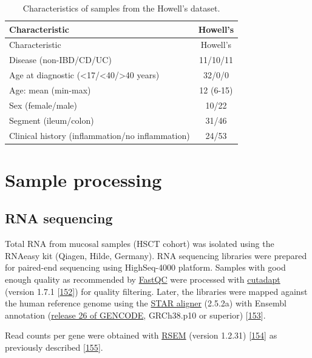\documentclass[
  12pt,
  a4paper,
  twoside,
  openright]{book}
\begin{document}
\begin{longtable}[]{@{}lc@{}}
\caption{\label{tab:howell} Characteristics of samples from the Howell's dataset.}\tabularnewline
\toprule
Characteristic & Howell's \\
\midrule
\endfirsthead
\toprule
Characteristic & Howell's \\
\midrule
\endhead
Disease (non-IBD/CD/UC) & 11/10/11 \\
Age at diagnostic (\textless17/\textless40/\textgreater40 years) & 32/0/0 \\
Age: mean (min-max) & 12 (6-15) \\
Sex (female/male) & 10/22 \\
Segment (ileum/colon) & 31/46 \\
Clinical history (inflammation/no inflammation) & 24/53 \\
\bottomrule
\end{longtable}

\hypertarget{processing}{%
\section{Sample processing}\label{processing}}

\hypertarget{rna-sequencing}{%
\subsection{RNA sequencing}\label{rna-sequencing}}

Total RNA from mucosal samples (HSCT cohort) was isolated using the RNAeasy kit (Qiagen, Hilde, Germany).
RNA sequencing libraries were prepared for paired-end sequencing using HighSeq-4000 platform.
Samples with good enough quality as recommended by \href{https://www.bioinformatics.babraham.ac.uk/projects/fastqc/}{FastQC} were processed with \href{https://github.com/marcelm/cutadapt}{cutadapt} (version 1.7.1 {[}\protect\hyperlink{ref-martin2011}{152}{]}) for quality filtering.
Later, the libraries were mapped against the human reference genome using the \href{https://github.com/alexdobin/STAR}{STAR aligner} (2.5.2a) with Ensembl annotation (\href{https://www.gencodegenes.org/human/release_26.html}{release 26 of GENCODE}, GRCh38.p10 or superior) {[}\protect\hyperlink{ref-dobin2013}{153}{]}.

Read counts per gene were obtained with \href{https://github.com/deweylab/RSEM}{RSEM} (version 1.2.31) {[}\protect\hyperlink{ref-li2011}{154}{]} as previously described {[}\protect\hyperlink{ref-corralizaDifferencesPeripheralTissue}{155}{]}.
\end{document}
